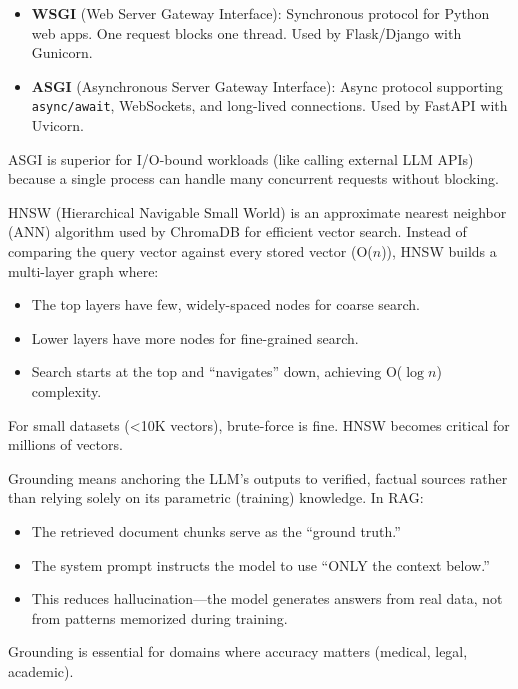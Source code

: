 \documentclass[12pt,a4paper]{article}
\begin{document}
\begin{interviewbox}
\end{interviewbox}
\begin{answerbox}
\begin{itemize}
  \item \textbf{WSGI} (Web Server Gateway Interface): Synchronous protocol for Python web apps. One request blocks one thread. Used by Flask/Django with Gunicorn.
  \item \textbf{ASGI} (Asynchronous Server Gateway Interface): Async protocol supporting \texttt{async/await}, WebSockets, and long-lived connections. Used by FastAPI with Uvicorn.
\end{itemize}
ASGI is superior for I/O-bound workloads (like calling external LLM APIs) because a single process can handle many concurrent requests without blocking.
\end{answerbox}

\begin{interviewbox}
\end{interviewbox}
\begin{answerbox}
HNSW (Hierarchical Navigable Small World) is an approximate nearest neighbor (ANN) algorithm used by ChromaDB for efficient vector search. Instead of comparing the query vector against every stored vector (O($n$)), HNSW builds a multi-layer graph where:
\begin{itemize}
  \item The top layers have few, widely-spaced nodes for coarse search.
  \item Lower layers have more nodes for fine-grained search.
  \item Search starts at the top and ``navigates'' down, achieving O($\log n$) complexity.
\end{itemize}
For small datasets (<10K vectors), brute-force is fine. HNSW becomes critical for millions of vectors.
\end{answerbox}

\begin{interviewbox}
\end{interviewbox}
\begin{answerbox}
Grounding means anchoring the LLM's outputs to verified, factual sources rather than relying solely on its parametric (training) knowledge. In RAG:
\begin{itemize}
  \item The retrieved document chunks serve as the ``ground truth.''
  \item The system prompt instructs the model to use ``ONLY the context below.''
  \item This reduces hallucination—the model generates answers from real data, not from patterns memorized during training.
\end{itemize}
Grounding is essential for domains where accuracy matters (medical, legal, academic).
\end{answerbox}
\end{document}
